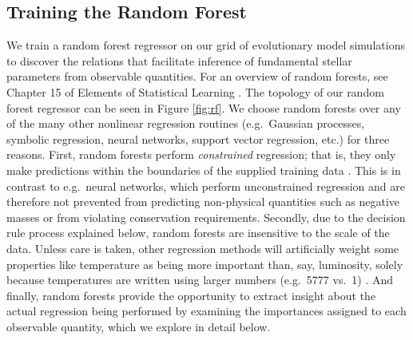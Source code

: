 \documentclass[manuscript]{aastex}
\begin{document}
\subsection{Training the Random Forest} \label{sec:forest}
We train a random forest regressor on our grid of evolutionary model simulations to discover the relations that facilitate inference of fundamental stellar parameters from observable quantities. For an overview of random forests, see Chapter 15 of Elements of Statistical Learning \citep{hastie2005elements}. The topology of our random forest regressor can be seen in Figure \ref{fig:rf}. We choose random forests over any of the many other nonlinear regression routines (e.g.~Gaussian processes, symbolic regression, neural networks, support vector regression, etc.) for three reasons. First, random forests perform \emph{constrained} regression; that is, they only make predictions within the boundaries of the supplied training data \citep[see section 9.2.1 of][]{hastie2005elements}. This is in contrast to e.g.~neural networks, which perform unconstrained regression and are therefore not prevented from predicting non-physical quantities such as negative masses or from violating conservation requirements. Secondly, due to the decision rule process explained below, random forests are insensitive to the scale of the data. Unless care is taken, other regression methods will artificially weight some properties like temperature as being more important than, say, luminosity, solely because temperatures are written using larger numbers (e.g.~5777 vs.~1) \citep[see section 11.5.3 of][]{hastie2005elements}. And finally, random forests provide the opportunity to extract insight about the actual regression being performed by examining the importances assigned to each observable quantity, which we explore in detail below. 
\end{document}
